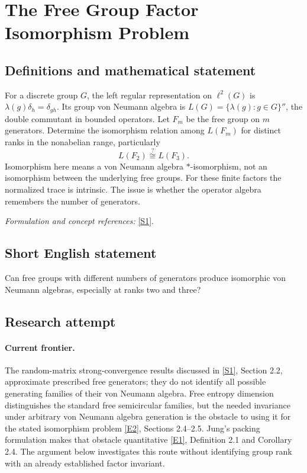\documentclass[11pt,a4paper]{article}
\newcommand{\sref}[2]{\hyperlink{source:#1:#2}{[S#2]}}
\newcommand{\eref}[2]{\hyperlink{extra:#1:#2}{[E#2]}}
\newif\ifshowcatalogue
\newcommand{\cataloguescope}[1]{\ifshowcatalogue
 \paragraph{Exact scope in the supplied catalogue.}
 \begin{quote}\small #1\end{quote}\fi}
\numberwithin{equation}{section}
\begin{document}
\setcounter{section}{173}
\clearpage
\section{\texorpdfstring{The Free Group Factor Isomorphism Problem}{The Free Group Factor Isomorphism Problem}}\label{174}
\subsection{Definitions and mathematical statement}
For a discrete group $G$, the left regular representation on $\ell^2(G)$ is $\lambda(g)\delta_h=\delta_{gh}$. Its group von Neumann algebra is
$L(G)=\{\lambda(g):g\in G\}''$, the double commutant in bounded operators. Let $F_m$ be the free group on $m$ generators. Determine the isomorphism relation among $L(F_m)$ for distinct ranks in the nonabelian range, particularly
\[
 L(F_2)\stackrel{?}{\cong}L(F_3).
\]
Isomorphism here means a von Neumann algebra $*$-isomorphism, not an isomorphism between the underlying free groups. For these finite factors the normalized trace is intrinsic. The issue is whether the operator algebra remembers the number of generators.
\par\smallskip\textit{Formulation and concept references:} \sref{174}{1}.
\cataloguescope{Determine whether L(F\_m) and L(F\_n) are isomorphic when m != n, especially whether L(F\_2) is isomorphic to L(F\_3).}
\subsection{Short English statement}
Can free groups with different numbers of generators produce isomorphic von Neumann algebras, especially at ranks two and three?
\subsection{Research attempt}

\paragraph{Current frontier.}
The random-matrix strong-convergence results discussed in \sref{174}{1},
Section 2.2, approximate prescribed free generators; they do not identify
all possible generating families of their von Neumann algebra. Free entropy
dimension distinguishes the standard free semicircular families, but the
needed invariance under arbitrary von Neumann algebra generation is the
obstacle to using it for the stated isomorphism problem
\eref{174}{2}, Sections 2.4--2.5. Jung's packing formulation makes that
obstacle quantitative \eref{174}{1}, Definition 2.1 and Corollary 2.4.
The argument below investigates this route without identifying group rank
with an already established factor invariant.
\end{document}
